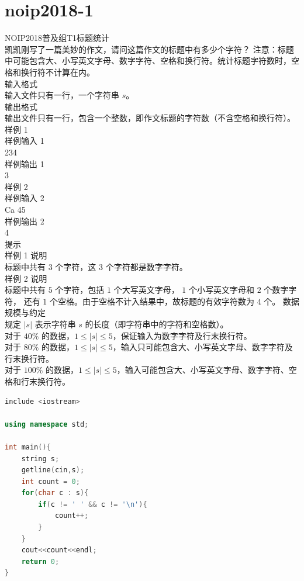 \documentclass[12pt,twiside,a4paper]{ctexbook}
\numberwithin{chapter}{part}
\begin{document}
\section{noip2018-1}
NOIP2018普及组T1标题统计\\
凯凯刚写了一篇美妙的作文，请问这篇作文的标题中有多少个字符？ 注意：标题中可能包含大、小写英文字母、数字字符、空格和换行符。统计标题字符数时，空格和换行符不计算在内。\\
输入格式\\
输入文件只有一行，一个字符串 $s$。\\
输出格式\\
输出文件只有一行，包含一个整数，即作文标题的字符数（不含空格和换行符）。\\
样例 1\\
样例输入 1\\
234\\
样例输出 1\\
3\\
 样例 2\\
 样例输入 2\\
Ca 45\\
 样例输出 2\\
4\\
 提示\\
样例 1 说明   \\
标题中共有 3 个字符，这 3 个字符都是数字字符。\\
样例 2 说明\\
标题中共有 $ 5$ 个字符，包括 $1$ 个大写英文字母， $1$ 个小写英文字母和 $2$ 个数字字符， 还有 $1$ 个空格。由于空格不计入结果中，故标题的有效字符数为 $4$ 个。 
数据规模与约定\\
规定 $|s|$ 表示字符串 $s$ 的长度（即字符串中的字符和空格数）。\\    
对于 $40\%$ 的数据，$1 ≤ |s| ≤ 5$，保证输入为数字字符及行末换行符。\\   
对于 $80\%$ 的数据，$1 ≤ |s| ≤ 5$，输入只可能包含大、小写英文字母、数字字符及行末换行符。\\   
对于 $100\%$ 的数据，$1 ≤ |s| ≤ 5$，输入可能包含大、小写英文字母、数字字符、空格和行末换行符。\\
\begin{lstlisting}[language=C++,breaklines=true]
include <iostream>

using namespace std;

int main(){
	string s;
	getline(cin,s);
	int count = 0;
	for(char c : s){
		if(c != ' ' && c != '\n'){
			count++;
		}
	}
	cout<<count<<endl;
	return 0;
}
\end{lstlisting}
\end{document}

